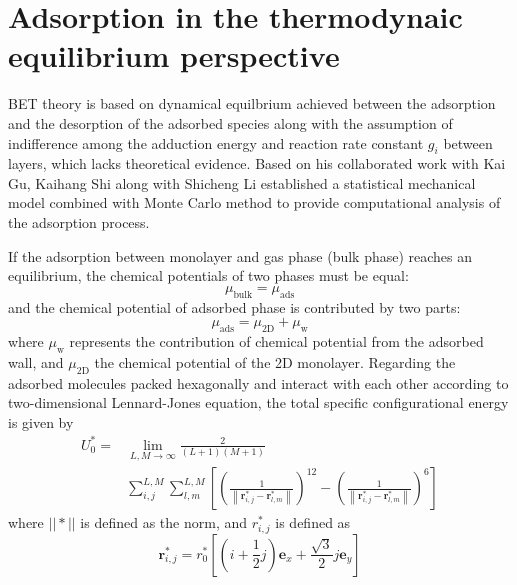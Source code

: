 \documentclass[%
 reprint,
 amsmath,amssymb,
 aps,
10.5pt,
]{revtex4-1}
\begin{document}
\section{Adsorption in the thermodynaic equilibrium perspective}
BET theory is based on dynamical equilbrium achieved between the adsorption and the desorption of the adsorbed species along with the assumption of indifference among the adduction energy and reaction rate constant $g_i$ between layers, which lacks theoretical evidence. Based on his collaborated work with Kai Gu\cite{shi2018high}, Kaihang Shi along with Shicheng Li established a statistical mechanical model combined with Monte Carlo method to provide computational analysis of the adsorption process.

If the adsorption between monolayer and gas phase (bulk phase) reaches an equilibrium, the chemical potentials of two phases must be equal:
\begin{equation}
	\mu_\text{bulk} = \mu_\text{ads}
\end{equation}
and the chemical potential of adsorbed phase is contributed by two parts:
\begin{equation}
	\mu_\text{ads} = \mu_\text{2D} + \mu_\text{w}
\end{equation}
where $\mu_\text{w}$ represents the contribution of chemical potential from the adsorbed wall, and $\mu_\text{2D}$ the chemical potential of the 2D monolayer. Regarding the adsorbed molecules packed hexagonally and interact with each other according to two-dimensional Lennard-Jones equation, the total specific configurational energy is given by
\begin{align}
	U _ { 0 } ^ { * } = &\lim _ { L , M \rightarrow \infty } \frac { 2 } { ( L + 1 ) ( M + 1 ) } \nonumber\\ & \sum _ { i , j} ^ { L , M } \sum _ { l , m} ^ { L , M } \left[ \left( \frac { 1 } { \left\| \mathbf { r } _ { i , j } ^ { * } - \mathbf { r } _ { l , m } ^ { * } \right\| } \right) ^ { 12 }- \left( \frac { 1 } { \left\| \mathbf { r } _ { i , j } ^ { * } - \mathbf { r } _ { l , m } ^ { * } \right\| } \right) ^ { 6 } \right]
\end{align}
where $||*||$ is defined as the norm, and $r_{i,j}^*$ is defined as
\begin{equation}
\mathbf { r } _ { i , j } ^ { * } = r _ { 0 } ^ { * } \left[ \left( i + \frac { 1 } { 2 } j \right) \mathbf { e } _ { x } + \frac { \sqrt { 3 } } { 2 } j \mathbf { e } _ { y } \right]
\end{equation}
\end{document}
